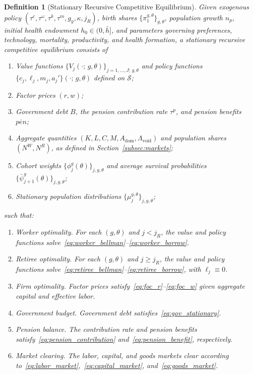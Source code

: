 \documentclass[12pt,a4paper]{article}
\newtheorem{definition}{Definition}
\begin{document}
\begin{definition}[Stationary Recursive Competitive Equilibrium]
\label{def:equilibrium}
Given exogenous policy $(\tau^c, \tau^\omega, \tau^k, \tau^m, g_y, \kappa, j_R)$, birth shares $\{\pi^{g,\theta}_1\}_{g,\theta}$, population growth $n_p$, initial health endowment $h_0 \in (0, \bar h]$, and parameters governing preferences, technology, mortality, productivity, and health formation, a stationary recursive competitive equilibrium consists of
\begin{enumerate}
\item Value functions $\{V_j(\cdot;\, g, \theta)\}_{j=1,\ldots,J;\, g,\theta}$ and policy functions $\{c_j, \ell_j, m_j, a_j'\}(\cdot;\, g, \theta)$ defined on $\mathcal{S}$;
\item Factor prices $(r,w)$;
\item Government debt $B$, the pension contribution rate $\tau^p$, and pension benefits $\overline{pen}$;
\item Aggregate quantities $(K,L,C,M,A_{\mathrm{dom}},\Lambda_{\mathrm{void}})$ and population shares $(N^W,N^R)$, as defined in Section~\ref{subsec:markets};
\item Cohort weights $\{\phi_j^{g}(\theta)\}_{j,g,\theta}$ and average survival probabilities $\{\bar\psi_{j+1}^{g}(\theta)\}_{j,g,\theta}$;
\item Stationary population distributions $\{\mu_j^{g,\theta}\}_{j,g,\theta}$;
\end{enumerate}
such that:
\begin{enumerate}
\item \emph{Worker optimality.} For each $(g,\theta)$ and $j<j_R$, the value and policy functions solve~\eqref{eq:worker_bellman}--\eqref{eq:worker_borrow}.
\item \emph{Retiree optimality.} For each $(g,\theta)$ and $j\geq j_R$, the value and policy functions solve~\eqref{eq:retiree_bellman}--\eqref{eq:retiree_borrow}, with $\ell_j\equiv 0$.
\item \emph{Firm optimality.} Factor prices satisfy~\eqref{eq:foc_r}--\eqref{eq:foc_w} given aggregate capital and effective labor.
\item \emph{Government budget.} Government debt satisfies~\eqref{eq:gov_stationary}.
\item \emph{Pension balance.} The contribution rate and pension benefits satisfy~\eqref{eq:pension_contribution} and~\eqref{eq:pension_benefit}, respectively.
\item \emph{Market clearing.} The labor, capital, and goods markets clear according to~\eqref{eq:labor_market},~\eqref{eq:capital_market}, and~\eqref{eq:goods_market}.

\end{enumerate}
\end{definition}
\end{document}
